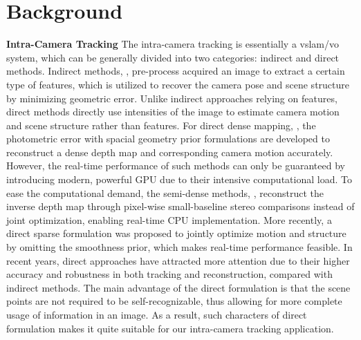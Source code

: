 \section{Background}
\noindent \textbf{Intra-Camera Tracking}
The intra-camera tracking is essentially a \acrshort{vslam}/\acrshort{vo} system, which can be generally divided into two categories: indirect and direct methods. 
Indirect methods, \cite{klein2007parallel} \cite{mur2017orb}, pre-process acquired an image to extract a certain type of features, which is utilized to recover the camera pose and scene structure by minimizing geometric error. 
Unlike indirect approaches relying on features, direct methods directly use intensities of the image to estimate camera motion and scene structure rather than features. 
For direct dense mapping, \cite{stuhmer2010real} \cite{newcombe2011dtam} \cite{pizzoli2014remode}, the photometric error with spacial geometry prior formulations are developed to reconstruct a dense depth map and corresponding camera motion accurately. 
However, the real-time performance of such methods can only be guaranteed by introducing modern, powerful GPU due to their intensive computational load. 
To ease the computational demand, the semi-dense methods, \cite{engel2013semi} \cite{engel2014lsd}, reconstruct the inverse depth map through pixel-wise small-baseline stereo comparisons instead of joint optimization, enabling real-time CPU implementation. 
More recently, a direct sparse formulation \cite{engel2018direct} was proposed to jointly optimize motion and structure by omitting the smoothness prior, which makes real-time performance feasible. 
In recent years, direct approaches have attracted more attention due to their higher accuracy and robustness in both tracking and reconstruction, compared with indirect methods. 
The main advantage of the direct formulation is that the scene points are not required to be self-recognizable, thus allowing for more complete usage of information in an image. 
As a result, such characters of direct formulation makes it quite suitable for our intra-camera tracking application. 


